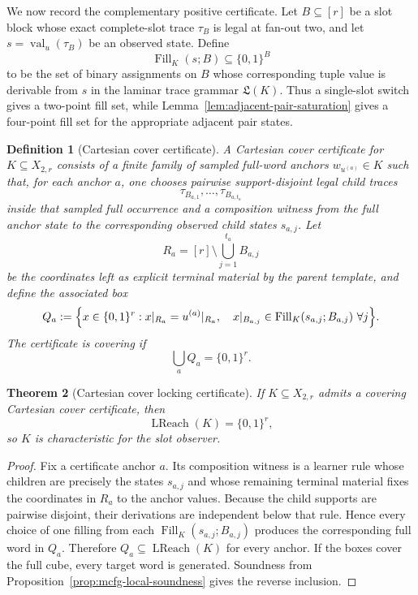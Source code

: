 \documentclass[11pt]{article}
\newtheorem{definition}{Definition}[section]
\newtheorem{theorem}[definition]{Theorem}
\begin{document}
We now record the complementary positive certificate.  Let $B\subseteq[r]$
be a slot block whose exact complete-slot trace $\tau_B$ is legal at fan-out
two, and let
$s=\operatorname{val}_{u}(\tau_B)$ be an observed state.  Define
\[
 \operatorname{Fill}_K(s;B)
 \subseteq \{0,1\}^{B}
\]
to be the set of binary assignments on $B$ whose corresponding tuple value is
derivable from $s$ in the laminar trace grammar $\mathfrak L(K)$.  Thus a
single-slot switch gives a two-point fill set, while
Lemma~\ref{lem:adjacent-pair-saturation} gives a four-point fill set for the
appropriate adjacent pair states.

\begin{definition}[Cartesian cover certificate]
\label{def:cartesian-cover-certificate}
A \emph{Cartesian cover certificate} for $K\subseteq X_{2,r}$ consists of a
finite family of sampled full-word anchors $w_{u^{(a)}}\in K$ such that, for
each anchor $a$, one chooses pairwise support-disjoint legal child traces
\[
 \tau_{B_{a,1}},\ldots,\tau_{B_{a,t_a}}
\]
inside that sampled full occurrence and a composition witness
from the full anchor state to the corresponding observed child states
$s_{a,j}$.  Let
\[
 R_a=[r]\setminus\bigcup_{j=1}^{t_a}B_{a,j}
\]
be the coordinates left as explicit terminal material by the parent template,
and define the associated box
\[
 Q_a:=\Bigl\{x\in\{0,1\}^r:
      x|_{R_a}=u^{(a)}|_{R_a},\quad
      x|_{B_{a,j}}\in\operatorname{Fill}_K(s_{a,j};B_{a,j})
      \ \forall j\Bigr\}.
\]
The certificate is \emph{covering} if
\[
 \bigcup_a Q_a=\{0,1\}^r.
\]
\end{definition}

\begin{theorem}[Cartesian cover locking certificate]
\label{thm:cartesian-cover-locking}
If $K\subseteq X_{2,r}$ admits a covering Cartesian cover certificate, then
\[
 \boxed{\operatorname{LReach}(K)=\{0,1\}^r,}
\]
so $K$ is characteristic for the slot observer.
\end{theorem}

\begin{proof}
Fix a certificate anchor $a$.  Its composition witness is a learner rule
whose children are precisely the states $s_{a,j}$ and whose remaining terminal
material fixes the coordinates in $R_a$ to the anchor values.  Because the
child supports are pairwise disjoint, their derivations are independent below
that rule.  Hence every choice of one filling from each
$\operatorname{Fill}_K(s_{a,j};B_{a,j})$ produces the corresponding full word
in $Q_a$.  Therefore $Q_a\subseteq\operatorname{LReach}(K)$ for every anchor.
If the boxes cover the full cube, every target word is generated.  Soundness from
Proposition~\ref{prop:mcfg-local-soundness} gives the reverse inclusion.
\end{proof}
\end{document}
